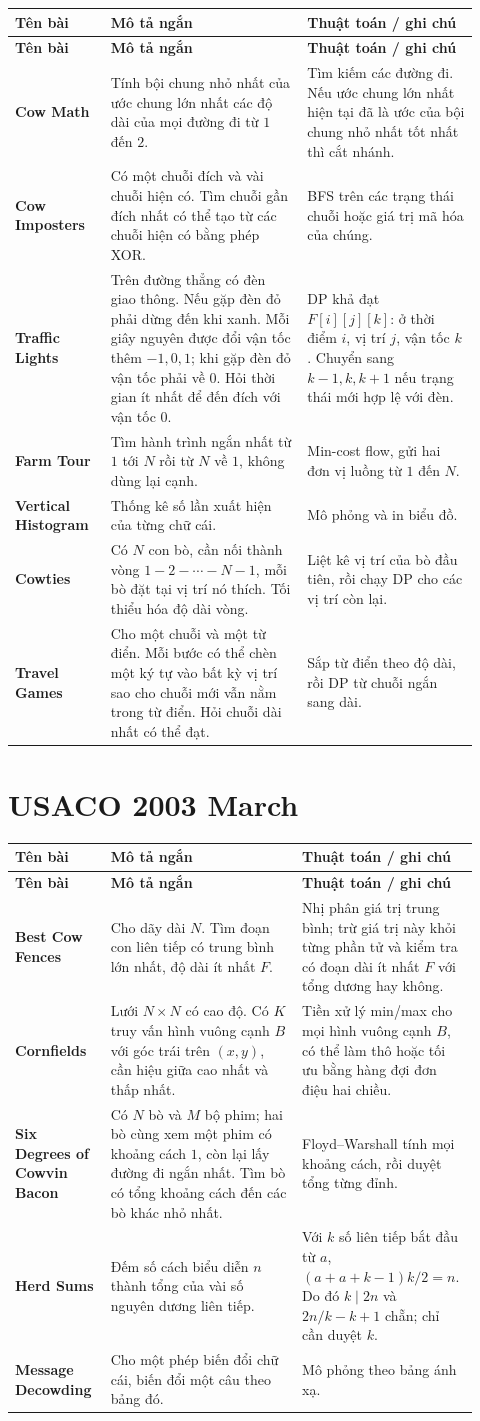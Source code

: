 \documentclass[11pt]{article}
\newenvironment{solutiontable}{%
  \small
  \setlength{\tabcolsep}{4pt}
  \renewcommand{\arraystretch}{1.14}
  \begin{longtable}{L{0.19\linewidth}L{0.39\linewidth}L{0.34\linewidth}}
  \toprule
  \textbf{Tên bài} & \textbf{Mô tả ngắn} & \textbf{Thuật toán / ghi chú}\\
  \midrule
  \endfirsthead
  \toprule
  \textbf{Tên bài} & \textbf{Mô tả ngắn} & \textbf{Thuật toán / ghi chú}\\
  \midrule
  \endhead
}{%
  \bottomrule
  \end{longtable}
  \normalsize
}
\newcommand{\problemrow}[3]{\textbf{#1} & #2 & #3\\\midrule}
\begin{document}
\begin{solutiontable}
\problemrow{Cow Math}{Tính bội chung nhỏ nhất của ước chung lớn nhất các độ dài của mọi đường đi từ \(1\) đến \(2\).}{Tìm kiếm các đường đi. Nếu ước chung lớn nhất hiện tại đã là ước của bội chung nhỏ nhất tốt nhất thì cắt nhánh.}
\problemrow{Cow Imposters}{Có một chuỗi đích và vài chuỗi hiện có. Tìm chuỗi gần đích nhất có thể tạo từ các chuỗi hiện có bằng phép XOR.}{BFS trên các trạng thái chuỗi hoặc giá trị mã hóa của chúng.}
\problemrow{Traffic Lights}{Trên đường thẳng có đèn giao thông. Nếu gặp đèn đỏ phải dừng đến khi xanh. Mỗi giây nguyên được đổi vận tốc thêm \(-1,0,1\); khi gặp đèn đỏ vận tốc phải về \(0\). Hỏi thời gian ít nhất để đến đích với vận tốc \(0\).}{DP khả đạt \(F[i][j][k]\): ở thời điểm \(i\), vị trí \(j\), vận tốc \(k\). Chuyển sang \(k-1,k,k+1\) nếu trạng thái mới hợp lệ với đèn.}
\problemrow{Farm Tour}{Tìm hành trình ngắn nhất từ \(1\) tới \(N\) rồi từ \(N\) về \(1\), không dùng lại cạnh.}{Min-cost flow, gửi hai đơn vị luồng từ \(1\) đến \(N\).}
\problemrow{Vertical Histogram}{Thống kê số lần xuất hiện của từng chữ cái.}{Mô phỏng và in biểu đồ.}
\problemrow{Cowties}{Có \(N\) con bò, cần nối thành vòng \(1-2-\cdots-N-1\), mỗi bò đặt tại vị trí nó thích. Tối thiểu hóa độ dài vòng.}{Liệt kê vị trí của bò đầu tiên, rồi chạy DP cho các vị trí còn lại.}
\problemrow{Travel Games}{Cho một chuỗi và một từ điển. Mỗi bước có thể chèn một ký tự vào bất kỳ vị trí sao cho chuỗi mới vẫn nằm trong từ điển. Hỏi chuỗi dài nhất có thể đạt.}{Sắp từ điển theo độ dài, rồi DP từ chuỗi ngắn sang dài.}
\end{solutiontable}

\section{USACO 2003 March}

\begin{solutiontable}
\problemrow{Best Cow Fences}{Cho dãy dài \(N\). Tìm đoạn con liên tiếp có trung bình lớn nhất, độ dài ít nhất \(F\).}{Nhị phân giá trị trung bình; trừ giá trị này khỏi từng phần tử và kiểm tra có đoạn dài ít nhất \(F\) với tổng dương hay không.}
\problemrow{Cornfields}{Lưới \(N\times N\) có cao độ. Có \(K\) truy vấn hình vuông cạnh \(B\) với góc trái trên \((x,y)\), cần hiệu giữa cao nhất và thấp nhất.}{Tiền xử lý min/max cho mọi hình vuông cạnh \(B\), có thể làm thô hoặc tối ưu bằng hàng đợi đơn điệu hai chiều.}
\problemrow{Six Degrees of Cowvin Bacon}{Có \(N\) bò và \(M\) bộ phim; hai bò cùng xem một phim có khoảng cách \(1\), còn lại lấy đường đi ngắn nhất. Tìm bò có tổng khoảng cách đến các bò khác nhỏ nhất.}{Floyd--Warshall tính mọi khoảng cách, rồi duyệt tổng từng đỉnh.}
\problemrow{Herd Sums}{Đếm số cách biểu diễn \(n\) thành tổng của vài số nguyên dương liên tiếp.}{Với \(k\) số liên tiếp bắt đầu từ \(a\), \((a+a+k-1)k/2=n\). Do đó \(k\mid 2n\) và \(2n/k-k+1\) chẵn; chỉ cần duyệt \(k\).}
\problemrow{Message Decowding}{Cho một phép biến đổi chữ cái, biến đổi một câu theo bảng đó.}{Mô phỏng theo bảng ánh xạ.}
\end{solutiontable}
\end{document}
